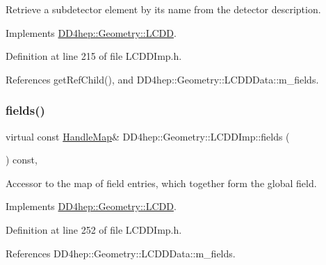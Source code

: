 Retrieve a subdetector element by it\textquotesingle{}s name from the detector description. 



Implements \hyperlink{class_d_d4hep_1_1_geometry_1_1_l_c_d_d_adcc7929860f5ac592d8f4c2d476555e9}{D\+D4hep\+::\+Geometry\+::\+L\+C\+DD}.



Definition at line 215 of file L\+C\+D\+D\+Imp.\+h.



References get\+Ref\+Child(), and D\+D4hep\+::\+Geometry\+::\+L\+C\+D\+D\+Data\+::m\+\_\+fields.

\hypertarget{class_d_d4hep_1_1_geometry_1_1_l_c_d_d_imp_af78d60748f098a61296c3d2db3a94a32}{}\label{class_d_d4hep_1_1_geometry_1_1_l_c_d_d_imp_af78d60748f098a61296c3d2db3a94a32} 
\subsubsection{\texorpdfstring{fields()}{fields()}}
{\footnotesize\ttfamily virtual const \hyperlink{class_d_d4hep_1_1_geometry_1_1_l_c_d_d_a05cb11e7355772c7b0794bcca59bf477}{Handle\+Map}\& D\+D4hep\+::\+Geometry\+::\+L\+C\+D\+D\+Imp\+::fields (\begin{DoxyParamCaption}{ }\end{DoxyParamCaption}) const\hspace{0.3cm}{\ttfamily [inline]}, {\ttfamily [virtual]}}



Accessor to the map of field entries, which together form the global field. 



Implements \hyperlink{class_d_d4hep_1_1_geometry_1_1_l_c_d_d_af2622f438504300116fabfa214b23be5}{D\+D4hep\+::\+Geometry\+::\+L\+C\+DD}.



Definition at line 252 of file L\+C\+D\+D\+Imp.\+h.



References D\+D4hep\+::\+Geometry\+::\+L\+C\+D\+D\+Data\+::m\+\_\+fields.

\hypertarget{class_d_d4hep_1_1_geometry_1_1_l_c_d_d_imp_a4eb2edfae225abead99a6cd6a85e84f7}{}\label{class_d_d4hep_1_1_geometry_1_1_l_c_d_d_imp_a4eb2edfae225abead99a6cd6a85e84f7} 
